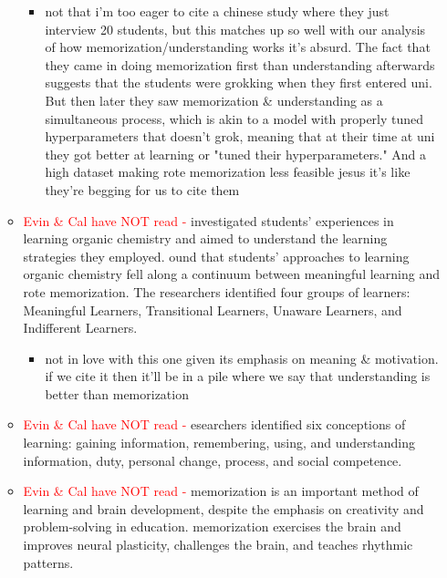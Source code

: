 \documentclass{article}
\begin{document}
\begin{itemize}
\begin{itemize}
        \begin{itemize}
            \item not that i'm too eager to cite a chinese study where they just interview 20 students, but this matches up so well with our analysis of how memorization/understanding works it's absurd. The fact that they came in doing memorization first than understanding afterwards suggests that the students were grokking when they first entered uni. But then later they saw memorization \& understanding as a simultaneous process, which is akin to a model with properly tuned hyperparameters that doesn't grok, meaning that at their time at uni they got better at learning or "tuned their hyperparameters." And a high dataset making rote memorization less feasible jesus it's like they're begging for us to cite them
        \end{itemize}
        \item \textcolor{red}{Evin \& Cal have NOT read - } \cite{grove2012continuum} investigated students' experiences in learning organic chemistry and aimed to understand the learning strategies they employed. ound that students' approaches to learning organic chemistry fell along a continuum between meaningful learning and rote memorization. The researchers identified four groups of learners: Meaningful Learners, Transitional Learners, Unaware Learners, and Indifferent Learners. 
        \begin{itemize}
            \item not in love with this one given its emphasis on meaning \& motivation. if we cite it then it'll be in a pile where we say that understanding is better than memorization
        \end{itemize}
        \item \textcolor{red}{Evin \& Cal have NOT read - } \cite{purdie2002assessing} esearchers identified six conceptions of learning: gaining information, remembering, using, and understanding information, duty, personal change, process, and social competence. 
        \item \textcolor{red}{Evin \& Cal have NOT read - } \cite{hoque2018memorization} memorization is an important method of learning and brain development, despite the emphasis on creativity and problem-solving in education. memorization exercises the brain and improves neural plasticity, challenges the brain, and teaches rhythmic patterns.

\end{itemize}
\end{itemize}
\end{document}
